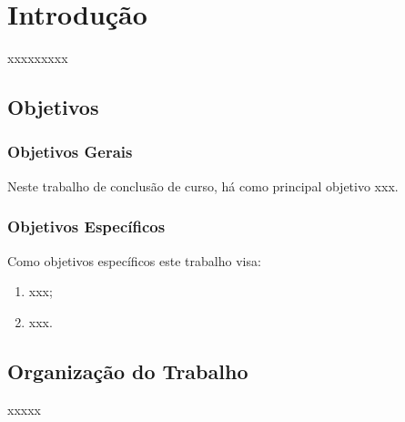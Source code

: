 \chapter{Introdução}

xxxxxxxxx

\section{Objetivos}

\subsection{Objetivos Gerais}

Neste trabalho de conclusão de curso, há como principal objetivo xxx.

\subsection{Objetivos Específicos}

Como objetivos específicos este trabalho visa:

\begin{enumerate}
\item xxx;
\item xxx.
\end{enumerate}

\section{Organização do Trabalho}

xxxxx
